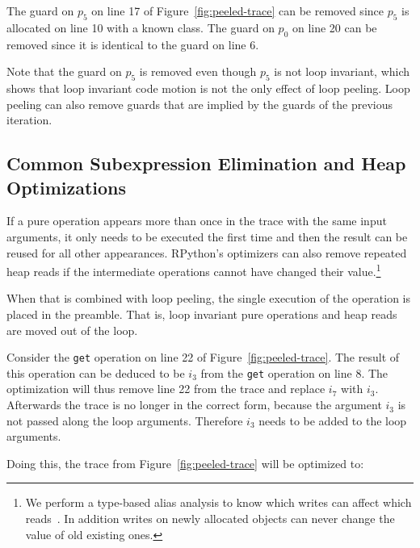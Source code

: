 \documentclass[preprint]{sigplanconf}
\let\oldcite=\cite
\renewcommand\cite[1]{\ifthenelse{\equal{#1}{XXX}}{[citation~needed]}{\oldcite{#1}}}
\begin{document}
The guard on $p_5$ on line 17 of Figure~\ref{fig:peeled-trace} can be
removed since $p_5$ is allocated on line 10 with a known class. The
guard on $p_0$ on line 20 can be removed since it is identical to the
guard on line 6.

Note that the guard on $p_5$ is removed even though $p_5$ is not loop
invariant, which shows that loop invariant code motion is not the only
effect of loop peeling. Loop peeling can also remove guards that are implied by
the guards of the previous iteration.



\subsection{Common Subexpression Elimination and Heap Optimizations}

If a pure operation appears more than once in the trace with the same input
arguments, it only needs to be executed the first time and then the result
can be reused for all other appearances. RPython's optimizers can also remove
repeated heap reads if the intermediate operations cannot have changed their
value.\footnote{We perform a type-based alias analysis to know which
writes can affect which reads~\cite{XXX}. In addition writes on newly allocated objects
can never change the value of old existing ones.}

When that is combined with loop peeling, the single execution of the operation
is placed in the preamble. That is, loop invariant pure operations and heap
reads are moved out of the loop. 

Consider the \lstinline{get} operation on line 22 of
Figure~\ref{fig:peeled-trace}. The result of this operation can be
deduced to be $i_3$ from the \lstinline{get} operation on line
8. The optimization will thus remove line 22 from the trace and
replace $i_7$ with $i_3$. Afterwards the trace is no longer in the correct
form, because the argument $i_3$ is not passed along the loop arguments.
Therefore $i_3$ needs to be added to the loop arguments.

Doing this, the trace from Figure~\ref{fig:peeled-trace} will be optimized to:
\end{document}
